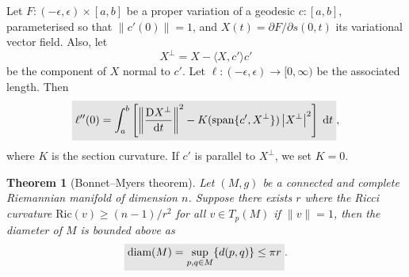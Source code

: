 \documentclass[letter-paper]{tufte-book}
\newtheorem{theorem}{\color{pastel-blue}Theorem}[section]
\newcommand{\highlight}[1]{\mathchoice%
  {\colorbox{black!10}{$\displaystyle#1$}}%
  {\colorbox{black!10}{$\textstyle#1$}}%
  {\colorbox{black!10}{$\scriptstyle#1$}}%
  {\colorbox{black!10}{$\scriptscriptstyle#1$}}}%
\begin{document}
Let $F:(-\epsilon, \epsilon) \times [a,b]$ be a proper variation of a geodesic $c:[a,b]$, parameterised so that $\|c'(0)\|=1$, and $X(t) = \partial F / \partial s (0,t)$ its variational vector field. Also, let
\begin{equation}
  X^\perp = X - \langle X,c'\rangle c'
\end{equation}
be the component of $X$ normal to $c'$. Let $\ell:(-\epsilon, \epsilon) \to [0, \infty)$ be the associated length. Then
\begin{equation}
  \highlight{\ell''(0) = \int_a^b \left[ \left\|\frac{\mathrm{D}X^\perp}{\mathrm{d}t} \right\|^2 - K(\mbox{span}\{c', X^\perp\}) \left|X^\perp\right|^2 \right]\; \mathrm{d}t},
\end{equation}
where $K$ is the section curvature. If $c'$ is parallel to $X^\perp$, we set $K=0$.

\begin{theorem}[Bonnet--Myers theorem]
  Let $(M,g)$ be a connected and complete Riemannian manifold of dimension $n$. Suppose there exists $r$ where the Ricci curvature $\mbox{Ric}(v) \geq (n-1)/r^2$ for all $v\in T_p(M)$ if $\|v\|=1$, then the diameter of $M$ is bounded above as
  \begin{equation}
    \highlight{\mbox{diam}(M) = \sup_{p,q\in M} \{d(p,q)\} \leq \pi r}.
  \end{equation}
\end{theorem}
\end{document}
